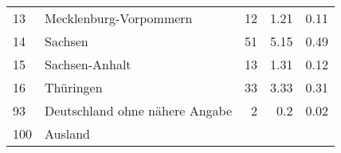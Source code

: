 \begin{longtable}{lXrrr}
     13 &
     \multicolumn{1}{X}{ Mecklenburg-Vorpommern   } &


       \num{12} &
       \num[round-mode=places,round-precision=2]{1.21} &
         \num[round-mode=places,round-precision=2]{0.11} \\

     14 &
     \multicolumn{1}{X}{ Sachsen   } &


       \num{51} &
       \num[round-mode=places,round-precision=2]{5.15} &
         \num[round-mode=places,round-precision=2]{0.49} \\

     15 &
     \multicolumn{1}{X}{ Sachsen-Anhalt   } &


       \num{13} &
       \num[round-mode=places,round-precision=2]{1.31} &
         \num[round-mode=places,round-precision=2]{0.12} \\

     16 &
     \multicolumn{1}{X}{ Thüringen   } &


       \num{33} &
       \num[round-mode=places,round-precision=2]{3.33} &
         \num[round-mode=places,round-precision=2]{0.31} \\

     93 &
     \multicolumn{1}{X}{ Deutschland ohne nähere Angabe   } &


       \num{2} &
       \num[round-mode=places,round-precision=2]{0.2} &
         \num[round-mode=places,round-precision=2]{0.02} \\

     100 &
     \multicolumn{1}{X}{ Ausland   } &



\end{longtable}
